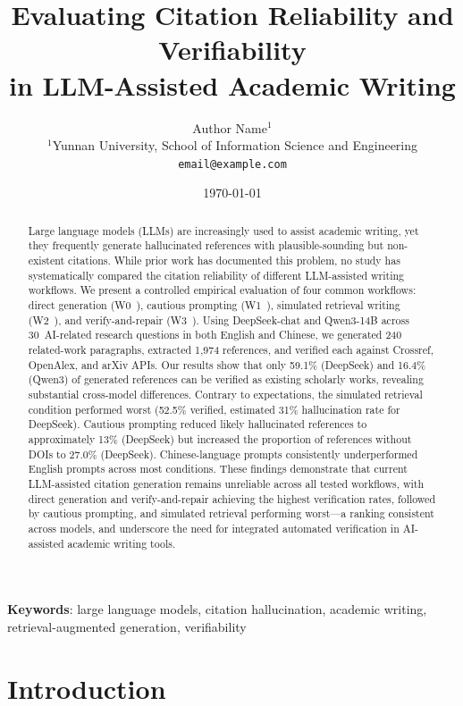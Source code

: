\documentclass[11pt,a4paper]{article}
\title{Evaluating Citation Reliability and Verifiability \\ in LLM-Assisted Academic Writing}
\author{Author Name$^{1}$ \\
$^{1}$Yunnan University, School of Information Science and Engineering \\
\texttt{email@example.com}
}
\date{\today}
\newcommand{\wzero}{W0~}
\newcommand{\wone}{W1~}
\newcommand{\wtwo}{W2~}
\newcommand{\wthree}{W3~}
\begin{document}
\maketitle

\begin{abstract}
Large language models (LLMs) are increasingly used to assist academic writing, yet they frequently generate hallucinated references with plausible-sounding but non-existent citations. While prior work has documented this problem, no study has systematically compared the citation reliability of different LLM-assisted writing workflows. We present a controlled empirical evaluation of four common workflows: direct generation (\wzero), cautious prompting (\wone), simulated retrieval writing (\wtwo), and verify-and-repair (\wthree). Using DeepSeek-chat and Qwen3-14B across 30~AI-related research questions in both English and Chinese, we generated 240 related-work paragraphs, extracted 1,974 references, and verified each against Crossref, OpenAlex, and arXiv APIs. Our results show that only 59.1\% (DeepSeek) and 16.4\% (Qwen3) of generated references can be verified as existing scholarly works, revealing substantial cross-model differences. Contrary to expectations, the simulated retrieval condition performed worst (52.5\% verified, estimated 31\% hallucination rate for DeepSeek). Cautious prompting reduced likely hallucinated references to approximately 13\% (DeepSeek) but increased the proportion of references without DOIs to 27.0\% (DeepSeek). Chinese-language prompts consistently underperformed English prompts across most conditions. These findings demonstrate that current LLM-assisted citation generation remains unreliable across all tested workflows, with direct generation and verify-and-repair achieving the highest verification rates, followed by cautious prompting, and simulated retrieval performing worst---a ranking consistent across models, and underscore the need for integrated automated verification in AI-assisted academic writing tools.
\end{abstract}

\noindent\textbf{Keywords}: large language models, citation hallucination, academic writing, retrieval-augmented generation, verifiability

\section{Introduction}
\label{sec:intro}
\end{document}
